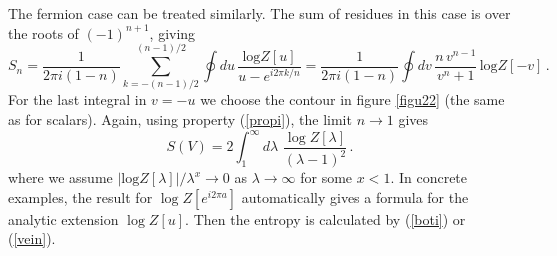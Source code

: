 \documentclass[11pt]{article}
\begin{document}
The fermion case can be treated similarly. The sum of residues in this case is over the roots of $(-1)^{n+1}$, giving
 \begin{equation}
S_n=\frac{1}{2\pi i (1-n)}\sum_{k=-(n-1)/2}^{(n-1)/2}\oint du \, \frac{\textrm{log}Z[u]}{u-e^{i 2 \pi k/n}}=\frac{1}{2\pi i (1-n)}\oint dv \,\frac{n\, v^{n-1}}{v^n+1}\,\textrm{log}Z[-v]\,.\label{chuta2}
\end{equation}
For the last integral in $v=-u$ we choose the contour in figure \ref{figu22} (the same as for scalars). Again, using property (\ref{propi}), the limit $n\rightarrow 1$ gives     
\begin{equation}
S(V)=2\int_1^{\infty}d\lambda\,\, \frac{\log Z[\lambda]}{(\lambda-1)^2}\,.\label{vein}
\end{equation}
where we assume $\left|\textrm{log} Z[\lambda]\right|/\lambda^x\rightarrow 0$ as $\lambda\rightarrow\infty$ for some $x<1$. 
In concrete examples, the result for $\log Z[e^{i 2 \pi a}]$ automatically gives a formula for the analytic extension $\log Z[u]$. Then the entropy is calculated by (\ref{boti}) or (\ref{vein}). 
\end{document}
